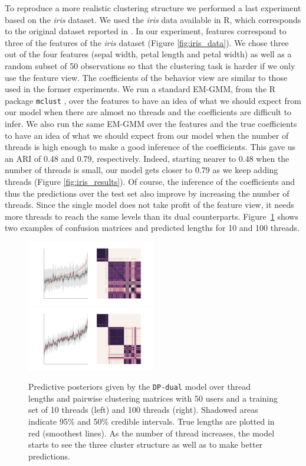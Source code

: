 \documentclass[smallextended]{svjour3}          %
\begin{document}
To reproduce a more realistic clustering structure we performed a last experiment based on the \textit{iris} dataset. We used the \textit{iris} data available in R, which corresponds to the original dataset reported in \cite{IrisData1935}. In our experiment, features correspond to three of the features of the \textit{iris} dataset (Figure \ref{fig:iris_data}). We chose three out of the four features (sepal width, petal length and petal width) as well as a random subset of 50 observations so that the clustering task is harder if we only use the feature view. The coefficients of the behavior view are similar to those used in the former experiments. We run a standard EM-GMM, from the R package \texttt{mclust} \citep{mclust}, over the features to have an idea of what we should expect from our model when there are almost no threads and the coefficients are difficult to infer. We also run the same EM-GMM over the features and the true coefficients to have an idea of what we should expect from our model when the number of threads is high enough to make a good inference of the coefficients. This gave us an ARI of 0.48 and 0.79, respectively. Indeed, starting nearer to 0.48 when the number of threads is small, our model gets closer to 0.79 as we keep adding threads (Figure \ref{fig:iris_results}). Of course, the inference of the coefficients and thus the predictions over the test set also improve by increasing the number of threads. Since the single model does not take profit of the feature view, it needs more threads to reach the same levels than its dual counterparts. Figure~\ref{fig:iris_posteriors} shows two examples of confusion matrices and predicted lengths for 10 and 100 threads.
\begin{figure}
	\centering
	\includegraphics[width=0.5\textwidth]{Fig9_iris_posterior_10}%
	\includegraphics[width=0.5\textwidth]{Fig9_iris_posterior_100}
	\caption{Predictive posteriors given by the \texttt{DP-dual} model over thread lengths and pairwise clustering matrices with 50 users and a training set of 10 threads (left) and 100 threads (right). Shadowed areas indicate 95\% and 50\% credible intervals. True lengths are plotted in red (smoothest lines). As the number of thread increases, the model starts to see the three cluster structure as well as to make better predictions.}
	\label{fig:iris_posteriors}
\end{figure}
\end{document}
